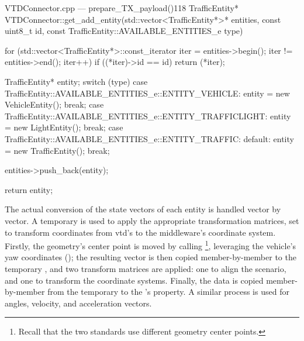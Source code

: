 \begin{codelist}{VTDConnector.cpp --- prepare\_TX\_payload()}{118}
TrafficEntity* VTDConnector::get_add_entity(std::vector<TrafficEntity*>* entities, const uint8_t id, const TrafficEntity::AVAILABLE_ENTITIES_e type) {
	for (std::vector<TrafficEntity*>::const_iterator iter = entities->begin(); iter != entities->end(); iter++)
		if ((*iter)->id == id)
			return (*iter);

	TrafficEntity* entity;
	switch (type) {
		case TrafficEntity::AVAILABLE_ENTITIES_e::ENTITY_VEHICLE:
			entity = new VehicleEntity();
			break;
		case TrafficEntity::AVAILABLE_ENTITIES_e::ENTITY_TRAFFICLIGHT:
			entity = new LightEntity();
			break;
		case TrafficEntity::AVAILABLE_ENTITIES_e::ENTITY_TRAFFIC:
		default:
			entity = new TrafficEntity();
			break;
	}

	entities->push_back(entity);

	return entity;
}
\end{codelist}

The actual conversion of the state vectors of each entity is handled vector by vector. A temporary  is used to apply the appropriate transformation matrices, set to transform coordinates from \gls{vtd}'s to the \gls{middleware}'s coordinate system. Firstly, the geometry's center point is moved by calling \footnote{Recall that the two standards use different geometry center points.}, leveraging the vehicle's yaw coordinates (); the resulting vector is then copied member-by-member to the temporary , and two transform matrices are applied: one to align the scenario, and one to transform the coordinate systems. Finally, the data is copied member-by-member from the temporary  to the 's  property. A similar process is used for angles, velocity, and acceleration vectors.

